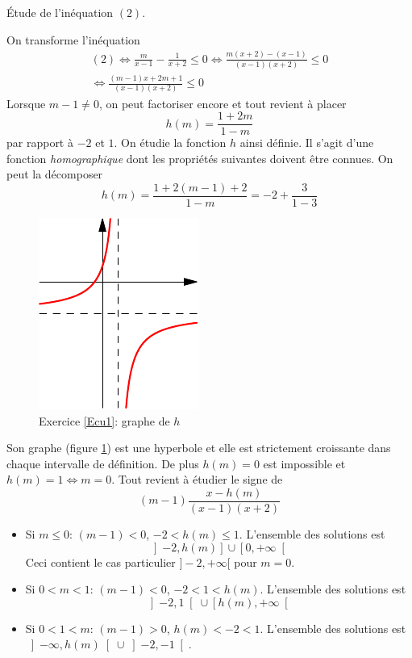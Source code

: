 \begin{center}
  \'Etude de l'inéquation $(2)$.
\end{center} 
On transforme l'inéquation 
\begin{multline*}
 (2)\Leftrightarrow
\frac{m}{x-1}-\frac{1}{x+2}\leq 0\Leftrightarrow
\frac{m(x+2)-(x-1)}{(x-1)(x+2)}\leq 0 \\
\Leftrightarrow
\frac{(m-1)x+2m+1}{(x-1)(x+2)}\leq 0
\end{multline*}
Lorsque $m-1\neq 0$, on peut factoriser encore et tout revient à placer 
\begin{displaymath}
 h(m) = \frac{1+2m}{1-m}
\end{displaymath}
par rapport à $-2$ et $1$. On étudie la fonction $h$ ainsi définie. Il s'agit d'une fonction \emph{homographique} dont les propriétés suivantes doivent être connues.\newline
On peut la décomposer
\begin{displaymath}
 h(m) = \frac{1+2(m-1)+2}{1-m}
= -2 + \frac{3}{1-3}
\end{displaymath}
\begin{figure}[h!]
 \centering
 \includegraphics{./Ccu01_1.pdf}
 \caption{Exercice \ref{Ecu1}: graphe de $h$}
 \label{fig:Ccu1_1}
\end{figure}
Son graphe (figure \ref{fig:Ccu1_1}) est une hyperbole et elle est strictement croissante dans chaque intervalle de définition. De plus $h(m)=0$ est impossible et $h(m)=1\Leftrightarrow m=0$.
Tout revient à étudier le signe de
\begin{displaymath}
 (m-1)\frac{x-h(m)}{(x-1)(x+2)}
\end{displaymath}
\begin{itemize}
 \item Si $m\leq 0$: $(m-1)<0$, $-2<h(m)\leq 1$. L'ensemble des solutions est
\begin{displaymath}
 \left] -2,h(m)\right] \cup \left[ 0, +\infty\right[ 
\end{displaymath}
Ceci contient le cas particulier $]-2,+\infty[$ pour $m=0$.
\item Si $0 < m < 1$: $(m-1)<0$, $-2< 1 < h(m)$. L'ensemble des solutions est
\begin{displaymath}
 \left] -2,1\right[ \cup \left[ h(m), +\infty\right[ 
\end{displaymath}
\item Si $0 < 1 < m$: $(m-1)>0$, $h(m) < -2< 1$. L'ensemble des solutions est
$
 \left] -\infty,h(m)\right[ \cup \left]-2, -1\right[ 
$.
\end{itemize}

